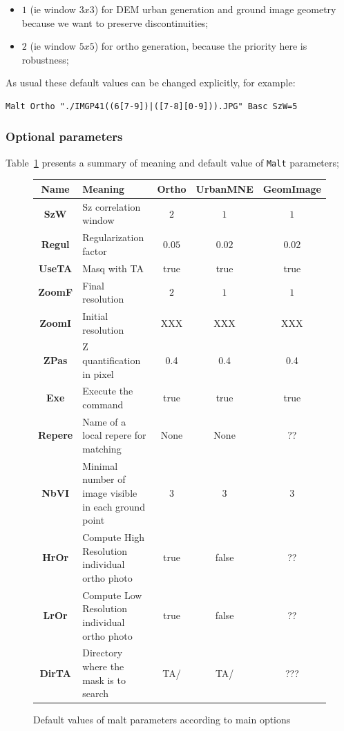 \begin{itemize}
   \item $1$ (ie window $3x3$) for DEM urban generation and ground image geometry
          because we want to preserve discontinuities;
   \item $2$ (ie window $5x5$) for ortho generation, because the priority here is robustness;
\end{itemize}

As usual these default values can be changed explicitly, for example:


\begin{verbatim}
Malt Ortho "./IMGP41((6[7-9])|([7-8][0-9])).JPG" Basc SzW=5
\end{verbatim}



\subsubsection{Optional parameters}

Table~\ref{Tab:ArgMalt} presents a summary of meaning and default value of
{\tt Malt} parameters;

\begin{figure}
\begin{tabular} { c | p{5 cm} | c | c | c}
{\bf Name }  &   {\bf Meaning } & {\bf Ortho } &  {\bf UrbanMNE} &{\bf GeomImage } \\  \hline \hline
{\bf SzW }  &   Sz correlation window & $2$ &  $ 1 $  &$1$ \\  \hline
{\bf Regul }  &  Regularization factor & $0.05$ &  $0.02$  & $0.02$ \\  \hline
{\bf UseTA }  &  Masq with TA & true &  true  & true \\  \hline
{\bf ZoomF }  &  Final resolution &  $2$ &  $1$   & $1$ \\  \hline
{\bf ZoomI }  &  Initial resolution &  XXX &  XXX   & XXX\\  \hline
{\bf ZPas }  &   Z quantification in pixel &  0.4 &  0.4  & 0.4 \\  \hline
{\bf Exe }  &   Execute the command &  true &  true   & true \\  \hline
{\bf Repere }  &   Name of a local repere for matching &  None &  None  & ?? \\  \hline
{\bf NbVI }  &   Minimal number of image visible in each ground point &  $3$ &  $3$ & $3$  \\  \hline
{\bf HrOr }  &   Compute High Resolution individual ortho photo &  true &  false  & ?? \\  \hline
{\bf LrOr }  &   Compute Low Resolution individual ortho photo &  true &  false  & ??\\  \hline
{\bf DirTA}  &   Directory where the mask is to search &  TA/ &  TA/   & ??? \\  \hline
\end{tabular}
\caption{Default values of malt parameters according to main options}
\label{Tab:ArgMalt}
\end{figure}

